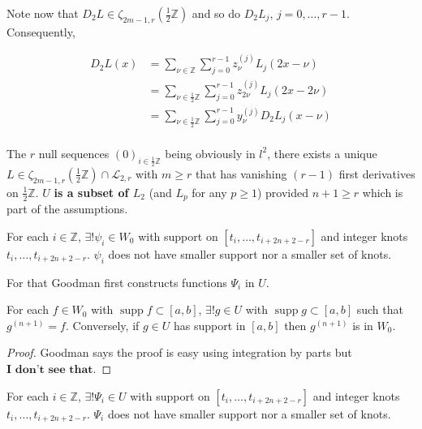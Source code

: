 \documentclass[a4paper, 11pt]{article}
\DeclareMathOperator*{\supp}{supp}
\begin{document}
\begin{itemize}
    Note now that $D_2L \in \zeta_{2m-1, r}(\frac{1}{2}\mathbb{Z})$ and so do $D_2L_j$, $j=0, \ldots, r-1$.  
    Consequently, 
    
    \begin{align*}
      D_2L(x) &= \sum_{\nu \in \mathbb{Z}} \sum_{j=0}^{r-1} z^{(j)}_{\nu} L_{j}(2x-\nu) \\
      &= \sum_{\nu \in \frac{1}{2}\mathbb{Z}} \sum_{j=0}^{r-1} z^{(j)}_{2\nu} L_{j}(2x-2\nu) \\
      &= \sum_{\nu \in \frac{1}{2}\mathbb{Z}} \sum_{j=0}^{r-1} y^{(j)}_{\nu} D_2L_{j}(x-\nu) \\
    \end{align*}

    The $r$ null sequences ${(0)}_{i \in \frac{1}{2}\mathbb{Z}}$ being obviously in $l^2$, there exists a unique $L \in 
    \zeta_{2m-1, r}(\frac{1}{2}\mathbb{Z}) \cap \mathcal{L}_{2,r}$ with $m \geq r$ that has vanishing $(r-1)$ first 
    derivatives on $\frac{1}{2}\mathbb{Z}$. $U$ \textbf{is a subset of $L_2$} (and $L_p$ for any $p \geq 1$) provided 
    $n+1 \geq r$ which is part of the assumptions.
\end{itemize}

\begin{thm}{3.1}
  For each $i \in \mathbb{Z}$, $\exists! \psi_i \in W_0$ with support on $[t_i,\ldots, t_{i+2n+2-r}]$ and integer knots 
  $t_i, \ldots, t_{i+2n+2-r}$. $\psi_i$ does not have smaller support nor a smaller set of knots.
\end{thm}

For that Goodman first constructs functions $\Psi_i$ in $U$.

\begin{lem}{3.1}
  For each $f \in W_0$ with $\supp f \subset [a,b]$, $\exists! g \in U$ with $\supp g \subset [a,b]$ such that 
  $g^{(n+1)} = f$. Conversely, if $g \in U$ has support in $[a,b]$ then $g^{(n+1)}$ is in $W_0$.
\end{lem}

\begin{proof} Goodman says the proof is easy using integration by parts but $\textbf{I don't see that}$.
\end{proof}

\begin{thm}{3.2}
  For each $i \in \mathbb{Z}$, $\exists! \Psi_i \in U$ with support on $[t_i,\ldots, t_{i+2n+2-r}]$ and integer knots 
  $t_i, \ldots, t_{i+2n+2-r}$. $\Psi_i$ does not have smaller support nor a smaller set of knots.
\end{thm}
\end{document}
